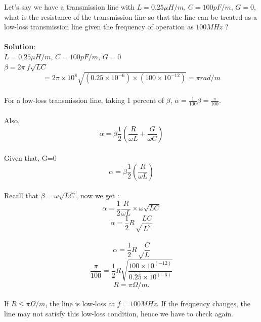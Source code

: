 \begin{exmp}
Let's say we have a transmission line with $L = 0.25\mu H/m$, ${C= 100pF/m}$, $G = 0$, what is the resistance of the transmission line so that the line can be treated as a low-loss transmission line given the frequency of operation as $100MHz$ ?\\\\
\textbf{Solution}:\\
$L= 0.25\mu H/m$, $C= 100pF/m$, $G = 0$\\
$\beta = 2\pi \ f {\sqrt{LC}}$
\begin{equation*}
=2 \pi \times 10^8 \sqrt{(0.25 \times 10^{-6}) \times (100 \times 10^{-12})}  = \pi rad/m
\end{equation*}\\
For a low-loss transmission line, taking 1 percent of $\beta$,
$ \alpha= \frac{1}{100} \beta = \frac{\pi}{100}$.\\\\
Also,
\begin{equation*}
\alpha = \beta\frac{1}{2} ( \frac{R}{\omega L} + \frac{G}{\omega C})
\end{equation*}\\
Given that, G=0\\
\begin{equation*}
\alpha = \beta\frac{1}{2} ( \frac{R}{\omega L} )
\end{equation*}\\
Recall that $\beta = \omega\sqrt{LC} $, now we get :
\begin{equation*}
\alpha = \frac{1}{2}\frac{R}{\omega L} \times \omega\sqrt{LC} 
\end{equation*}
\begin{equation*}
\alpha = \frac{1}{2} R \sqrt \frac{LC}{L^{2}} 
\end{equation*}\\
\begin{equation*}
\alpha = \frac{1}{2} R \sqrt \frac{C}{L}
\end{equation*}
\begin{equation*}
\frac{\pi}{100} = \frac{1}{2} R \sqrt{\frac{100 \times 10^{(-12)}}{0.25 \times 10^{(-6)}}}
\end{equation*}
\begin{equation*}
R=\pi\Omega/m.
\end{equation*}\\
If $R \leq \pi\Omega/m$, the line is low-loss at $ f= 100MHz$. If the frequency changes, the line may not satisfy this low-loss condition, hence we have to check again.
\end{exmp}


